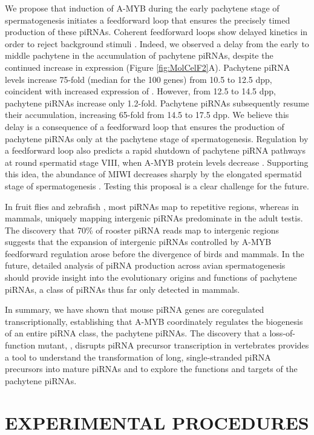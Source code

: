   We propose that induction of A-MYB during the early pachytene stage of spermatogenesis initiates a feedforward loop that ensures the precisely timed production of these piRNAs. Coherent feedforward loops show delayed kinetics in order to reject background stimuli \citep{Mangan2003}. Indeed, we observed a delay from the early to middle pachytene in the accumulation of pachytene piRNAs, despite the continued increase in \amyb{} expression (Figure \ref{fig:MolCelF2}A). Pachytene piRNA levels increase 75-fold (median for the 100 genes) from 10.5 to 12.5 dpp, coincident with increased expression of \amyb{}. However, from 12.5 to 14.5 dpp, pachytene piRNAs increase only 1.2-fold. Pachytene piRNAs subsequently resume their accumulation, increasing 65-fold from 14.5 to 17.5 dpp. We believe this delay is a consequence of a feedforward loop that ensures the production of pachytene piRNAs only at the pachytene stage of spermatogenesis. Regulation by a feedforward loop also predicts a rapid shutdown of pachytene piRNA pathways at round spermatid stage VIII, when A-MYB protein levels decrease \citep{Horvath2009}. Supporting this idea, the abundance of MIWI decreases sharply by the elongated spermatid stage of spermatogenesis \citep{Deng2002c}. Testing this proposal is a clear challenge for the future.

  In fruit flies and zebrafish \citep{Brennecke2007, Houwing2007}, most piRNAs map to repetitive regions, whereas in mammals, uniquely mapping intergenic piRNAs predominate in the adult testis. The discovery that 70\% of rooster piRNA reads map to intergenic regions suggests that the expansion of intergenic piRNAs controlled by A-MYB feedforward regulation arose before the divergence of birds and mammals. In the future, detailed analysis of piRNA production across avian spermatogenesis should provide insight into the evolutionary origins and functions of pachytene piRNAs, a class of piRNAs thus far only detected in mammals.

  In summary, we have shown that mouse piRNA genes are coregulated transcriptionally, establishing that A-MYB coordinately regulates the biogenesis of an entire piRNA class, the pachytene piRNAs. The discovery that a loss-of-function \amyb{} mutant, \mybrepro{}, disrupts piRNA precursor transcription in vertebrates provides a tool to understand the transformation of long, single-stranded piRNA precursors into mature piRNAs and to explore the functions and targets of the pachytene piRNAs.

\section{EXPERIMENTAL PROCEDURES}

